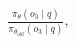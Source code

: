 \documentclass[preview]{standalone}
\begin{document}
\begin{align*}
\frac{\pi_\theta(o_3 \mid q)}{\pi_{\theta_{\text{old}}}(o_3 \mid q)},
\end{align*}
\end{document}
